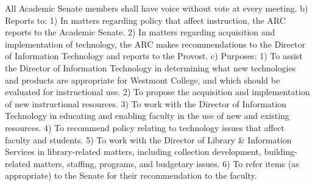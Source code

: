 \documentclass[letterpaper, 11pt]{article}
\begin{document}
				All Academic Senate members shall have voice without vote at every meeting.
				b) Reports to:
				1) In matters regarding policy that affect instruction, the ARC reports to the Academic Senate.
				2) In matters regarding acquisition and implementation of technology, the ARC makes recommendations to the Director of Information Technology and reports to the Provost.
				c) Purposes:
				1) To assist the Director of Information Technology in determining what new technologies and products are appropriate for Westmont College, and which should be evaluated for instructional use.
				2) To propose the acquisition and implementation of new instructional resources.
				3) To work with the Director of Information Technology in educating and enabling faculty in the use of new and existing resources.
				4) To recommend policy relating to technology issues that affect faculty and students.
				5) To work with the Director of Library \& Information Services in library-related matters, including collection development, building-related matters, staffing, programs, and budgetary issues.
				6) To refer items (as appropriate) to the Senate for their recommendation to the faculty.
\end{document}
